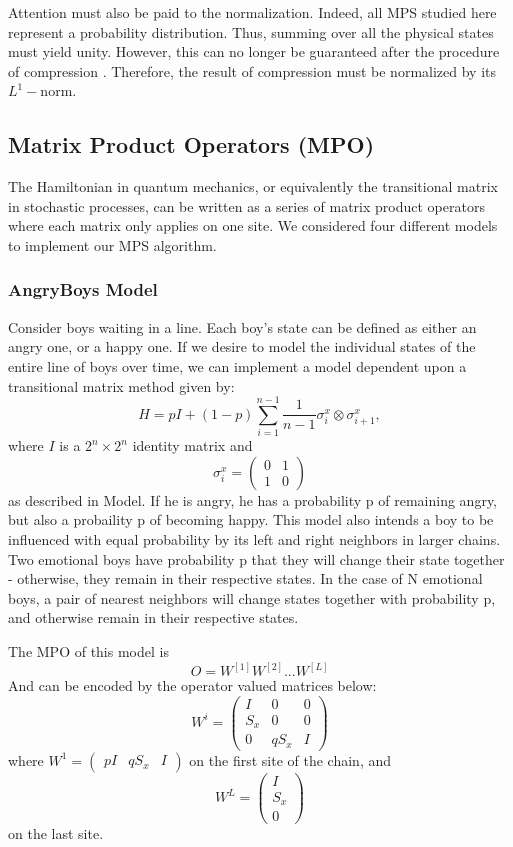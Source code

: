 \documentclass[english]{article}
\begin{document}
Attention must also be paid to the normalization. Indeed, all MPS studied here represent a probability distribution. Thus, summing over all the physical states must yield unity. However, this can no longer be guaranteed after the procedure of compression . Therefore, the result of compression must be normalized by its $L^1-$norm.


\subsection{Matrix Product Operators (MPO)}
The Hamiltonian in quantum mechanics, or equivalently the transitional matrix in stochastic processes, can be written as a series of matrix product operators where each matrix only applies on one site.
We considered four different models to implement our MPS algorithm.
\subsubsection{AngryBoys Model}
Consider boys waiting in a line. Each boy's state can be defined as either an angry one, or a happy one. If we desire to model the individual states of the entire line of boys over time, we can implement a model dependent upon a transitional matrix method given by:
\begin{displaymath}
H = pI + (1-p)\sum_{i=1}^{n-1}\frac{1}{n-1}\sigma_i^x\otimes\sigma_{i+1}^x,
\end{displaymath}
where $I$ is a $2^n\times2^n$ identity matrix and 
\begin{displaymath}
\sigma_i^x = 
\begin{pmatrix}
0 & 1 \\
1 & 0
\end{pmatrix}
\end{displaymath}
as described in Model. If he is angry, he has a probability p of remaining angry, but also a probaility p of becoming happy. This model also intends a boy to be influenced with equal probability by its left and right neighbors in larger chains. Two emotional boys have probability p that they will change their state together - otherwise, they remain in their respective states. In the case of N emotional boys, a pair of nearest neighbors will change states together with probability p, and otherwise remain in their respective states.


The MPO of this model is 
$$
O=W^{[1]}W^{[2]} ... W^{[L]}
$$
And can be encoded by the operator valued matrices below:
$$
W^{i}=
\begin{pmatrix}
I & 0 & 0 \\
S_x & 0 & 0 \\
0 & qS_x & I
\end{pmatrix}
$$
where $W^1=\begin{pmatrix}p I & q S_x & I\end{pmatrix}$ on the first site of the chain, and
$$W^L=\begin{pmatrix}
I \\ S_x \\ 0
\end{pmatrix}$$
on the last site.
\end{document}
